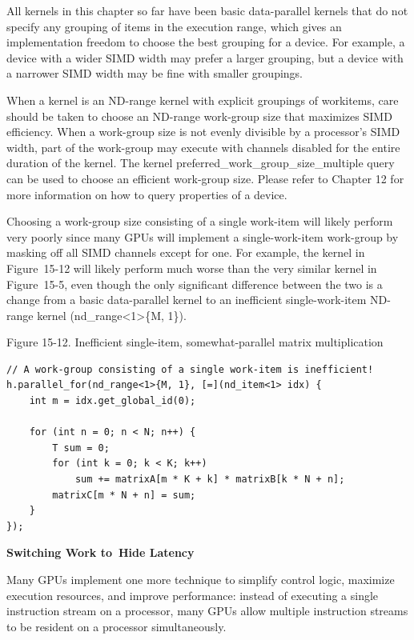 All kernels in this chapter so far have been basic data-parallel kernels that do not specify any grouping of items in the execution range, which gives an implementation freedom to choose the best grouping for a device. For example, a device with a wider SIMD width may prefer a larger grouping, but a device with a narrower SIMD width may be fine with smaller groupings.\par

When a kernel is an ND-range kernel with explicit groupings of workitems, care should be taken to choose an ND-range work-group size that maximizes SIMD efficiency. When a work-group size is not evenly divisible by a processor’s SIMD width, part of the work-group may execute with channels disabled for the entire duration of the kernel. The kernel preferred\_work\_group\_size\_multiple query can be used to choose an efficient work-group size. Please refer to Chapter 12 for more information on how to query properties of a device.\par

Choosing a work-group size consisting of a single work-item will likely perform very poorly since many GPUs will implement a single-work-item work-group by masking off all SIMD channels except for one. For example, the kernel in Figure 15-12 will likely perform much worse than the very similar kernel in Figure 15-5, even though the only significant difference between the two is a change from a basic data-parallel kernel to an inefficient single-work-item ND-range kernel (nd\_range<1>\{M, 1\}).\par

\hspace*{\fill} \par %
Figure 15-12. Inefficient single-item, somewhat-parallel matrix multiplication
\begin{lstlisting}[caption={}]
// A work-group consisting of a single work-item is inefficient!
h.parallel_for(nd_range<1>{M, 1}, [=](nd_item<1> idx) {
	int m = idx.get_global_id(0);
	
	for (int n = 0; n < N; n++) {
		T sum = 0;
		for (int k = 0; k < K; k++)
			sum += matrixA[m * K + k] * matrixB[k * N + n];
		matrixC[m * N + n] = sum;
	}
});
\end{lstlisting}

\hspace*{\fill} \par %
\textbf{Switching Work to Hide Latency}

Many GPUs implement one more technique to simplify control logic, maximize execution resources, and improve performance: instead of executing a single instruction stream on a processor, many GPUs allow multiple instruction streams to be resident on a processor simultaneously.\par

